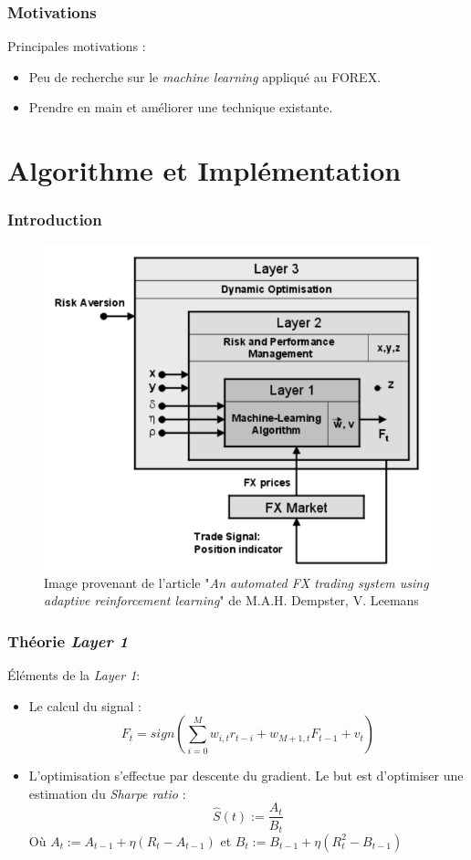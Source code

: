 \documentclass{beamer}
\begin{document}
	\begin{frame}
		\frametitle{Motivations}
		Principales motivations :
		\begin{itemize}
			\item Peu de recherche sur le \textit{machine learning} appliqué au FOREX.
			\item Prendre en main et améliorer une technique existante.
		\end{itemize}
	\end{frame}
	
	\section{Algorithme et Implémentation}
	
	\begin{frame}
		\frametitle{Introduction}
		\begin{figure}
			\includegraphics[scale=0.3]{../Rapport/images/exemple_nn_projet}
			\caption[]{Image provenant de l'article "\textit{An automated FX trading system using adaptive reinforcement learning}" de M.A.H. Dempster, V. Leemans }
		\end{figure}
	\end{frame}

	\begin{frame}
		\frametitle{Théorie \textit{Layer 1}}
		Éléments de la \textit{Layer 1}:
		\begin{itemize}
			\item Le calcul du signal : $$F_t = sign(\sum_{i=0}^{M} w_{i,t}r_{t-i} + w_{M + 1,t}F_{t-1} + v_t)$$
			\item L'optimisation s'effectue par descente du gradient. Le but est d'optimiser une estimation du \textit{Sharpe ratio} : $$\widehat{S}(t):= \frac{A_t}{B_t}$$ Où $A_t := A_{t-1} + \eta (R_t -A_{t-1})$ et $B_t := B_{t-1} + \eta (R_t^2 -B_{t-1})$
		\end{itemize}
	\end{frame}
\end{document}
